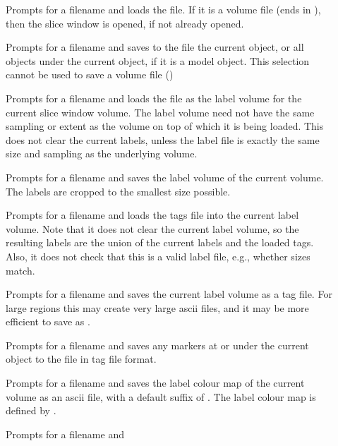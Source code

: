 \begin{description}
\item[]  Prompts for a filename and loads the file.
        If it is a volume file (ends in ), then the
        slice window is opened, if not already opened.
\item[]  Prompts for a filename and saves to the file
        the current object, or all objects under the current object, if it is
        a model object.  This selection cannot be used to save a volume
        file ()
\item[]  Prompts for a filename and
        loads the file as the label volume for the current slice window
        volume.
        The label volume need not have the same sampling or extent as
        the volume on top of which it is being loaded.  This does not clear
        the current labels, unless the label file is exactly the same size and
        sampling as the underlying volume.
\item[]  Prompts for a filename and
        saves the label volume of the current volume.  The labels are cropped
        to the smallest size possible.
\item[]  Prompts for a filename and
        loads the tags file into the current label volume.  Note that it does
        not clear the current label volume, so the resulting labels are the
        union of the current labels and the loaded tags.  Also, it does not
        check that this is a valid label file, e.g., whether sizes match.
\item[]  Prompts for a filename and
        saves the current label volume as a tag file.  For large regions
        this may create very large ascii files, and it may be more
        efficient to save as .
\item[]  Prompts for a filename and
        saves any markers at or under the current object to the file
        in tag file format.
\item[]  Prompts for a filename and
        saves the label colour map of the current volume as an ascii file,
        with a default
        suffix of .  The label colour map is defined by
        .
\item[]  Prompts for a filename and

\end{description}
